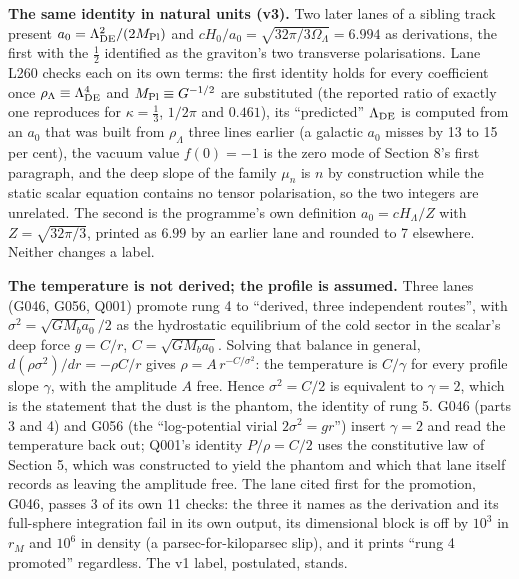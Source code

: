 \documentclass[
  11pt,
]{article}
\begin{document}
\textbf{The same identity in natural units (v3).} Two later lanes of a
sibling track present \(a_0 = \Lambda_{\rm DE}^2/(2M_{\rm Pl})\) and
\(cH_0/a_0 = \sqrt{32\pi/3\Omega_\Lambda} = 6.994\) as derivations, the
first with the \(\tfrac12\) identified as the graviton's two transverse
polarisations. Lane L260 checks each on its own terms: the first
identity holds for every coefficient once
\(\rho_\Lambda \equiv \Lambda_{\rm DE}^4\) and
\(M_{\rm Pl} \equiv G^{-1/2}\) are substituted (the reported ratio of
exactly one reproduces for \(\kappa = \tfrac13\), \(1/2\pi\) and
\(0.461\)), its ``predicted'' \(\Lambda_{\rm DE}\) is computed from an
\(a_0\) that was built from \(\rho_\Lambda\) three lines earlier (a
galactic \(a_0\) misses by 13 to 15 per cent), the vacuum value
\(f(0) = -1\) is the zero mode of Section 8's first paragraph, and the
deep slope of the family \(\mu_n\) is \(n\) by construction while the
static scalar equation contains no tensor polarisation, so the two
integers are unrelated. The second is the programme's own definition
\(a_0 = cH_\Lambda/Z\) with \(Z = \sqrt{32\pi/3}\), printed as \(6.99\)
by an earlier lane and rounded to 7 elsewhere. Neither changes a label.

\textbf{The temperature is not derived; the profile is assumed.} Three
lanes (G046, G056, Q001) promote rung 4 to ``derived, three independent
routes'', with \(\sigma^2 = \sqrt{GM_ba_0}/2\) as the hydrostatic
equilibrium of the cold sector in the scalar's deep force \(g = C/r\),
\(C = \sqrt{GM_ba_0}\). Solving that balance in general,
\(d(\rho\sigma^2)/dr = -\rho C/r\) gives \(\rho = A\,r^{-C/\sigma^2}\):
the temperature is \(C/\gamma\) for every profile slope \(\gamma\), with
the amplitude \(A\) free. Hence \(\sigma^2 = C/2\) is equivalent to
\(\gamma = 2\), which is the statement that the dust is the phantom, the
identity of rung 5. G046 (parts 3 and 4) and G056 (the ``log-potential
virial \(2\sigma^2 = gr\)'') insert \(\gamma = 2\) and read the
temperature back out; Q001's identity \(P/\rho = C/2\) uses the
constitutive law of Section 5, which was constructed to yield the
phantom and which that lane itself records as leaving the amplitude
free. The lane cited first for the promotion, G046, passes 3 of its own
11 checks: the three it names as the derivation and its full-sphere
integration fail in its own output, its dimensional block is off by
\(10^3\) in \(r_M\) and \(10^6\) in density (a parsec-for-kiloparsec
slip), and it prints ``rung 4 promoted'' regardless. The v1 label,
postulated, stands.
\end{document}
